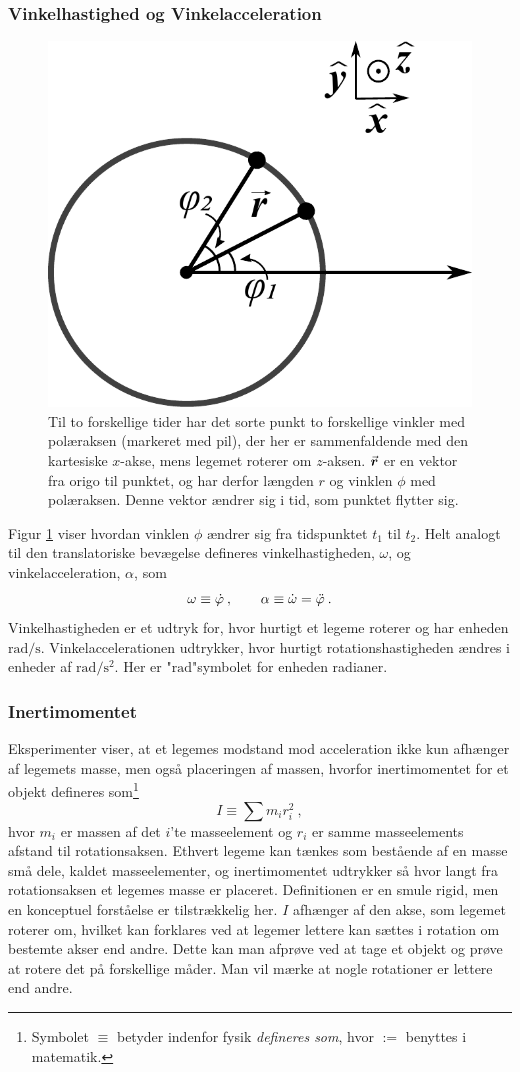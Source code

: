 \subsubsection{Vinkelhastighed og Vinkelacceleration}
%
\begin{figure}[h!]
\centering
\includegraphics[width=.4\textwidth]{Analytisk-Mekanik/Roterende-Legeme}
\caption{Til to forskellige tider har det sorte punkt to forskellige vinkler med polæraksen (markeret med pil), der her er sammenfaldende med den kartesiske $x$-akse, mens legemet roterer om $z$-aksen. ${\vec{\boldsymbol{r}}}$ er en vektor fra origo til punktet, og har derfor længden $r$ og vinklen $\phi$ med polæraksen. Denne vektor ændrer sig i tid, som punktet flytter sig.}
\label{fig:Roterende-Legeme}
\end{figure}
%
Figur \ref{fig:Roterende-Legeme} viser hvordan vinklen $\phi$ ændrer sig fra tidspunktet $t_1$ til $t_2$. Helt analogt til den translatoriske bevægelse defineres vinkelhastigheden, $\omega$, og vinkelacceleration, $\alpha$, som
%
\begin{equation}
    \omega\equiv\dot{\varphi} \: , \qquad \alpha\equiv\dot{\omega}=\ddot{\varphi} \: .
\end{equation}
%
Vinkelhastigheden er et udtryk for, hvor hurtigt et legeme roterer og har enheden $\si{\radian/\second}$. Vinkelaccelerationen udtrykker, hvor hurtigt rotationshastigheden ændres i enheder af $\si{\radian/\second\squared}$. Her er "$\si{\radian}$"\;symbolet for enheden radianer.

\subsubsection{Inertimomentet}
Eksperimenter viser, at et legemes modstand mod acceleration ikke kun afhænger af legemets masse, men også placeringen af massen, hvorfor inertimomentet for et objekt defineres som\footnote{Symbolet $\equiv$ betyder indenfor fysik \textit{defineres som}, hvor $:=$ benyttes i matematik.}
%
\begin{equation} \label{eq:Inertimoment}
    I \equiv \sum m_ir_i^2 \: ,
\end{equation}
%
hvor $m_i$ er massen af det $i$'te masseelement og $r_i$ er samme masseelements afstand til rotationsaksen. Ethvert legeme kan tænkes som bestående af en masse små dele, kaldet masseelementer, og inertimomentet udtrykker så hvor langt fra rotationsaksen et legemes masse er placeret. Definitionen er en smule rigid, men en konceptuel forståelse er tilstrækkelig her. $I$ afhænger af den akse, som legemet  roterer om, hvilket kan forklares ved at legemer lettere kan sættes i rotation om bestemte akser end andre. Dette kan man afprøve ved at tage et objekt og prøve at rotere det på forskellige måder. Man vil mærke at nogle rotationer er lettere end andre.


